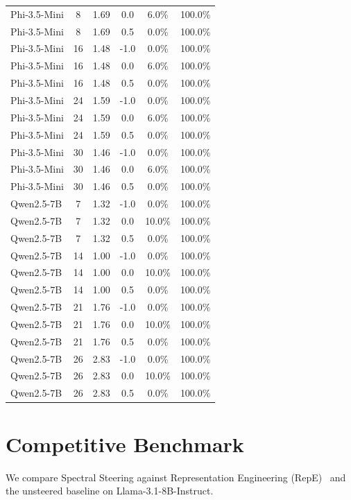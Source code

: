 \documentclass{article}
\begin{document}
\begin{center}
\begin{tabular}{lccccc}
Phi-3.5-Mini & 8 & 1.69 & 0.0 & 6.0\% & 100.0\% \\
Phi-3.5-Mini & 8 & 1.69 & 0.5 & 0.0\% & 100.0\% \\
Phi-3.5-Mini & 16 & 1.48 & -1.0 & 0.0\% & 100.0\% \\
Phi-3.5-Mini & 16 & 1.48 & 0.0 & 6.0\% & 100.0\% \\
Phi-3.5-Mini & 16 & 1.48 & 0.5 & 0.0\% & 100.0\% \\
Phi-3.5-Mini & 24 & 1.59 & -1.0 & 0.0\% & 100.0\% \\
Phi-3.5-Mini & 24 & 1.59 & 0.0 & 6.0\% & 100.0\% \\
Phi-3.5-Mini & 24 & 1.59 & 0.5 & 0.0\% & 100.0\% \\
Phi-3.5-Mini & 30 & 1.46 & -1.0 & 0.0\% & 100.0\% \\
Phi-3.5-Mini & 30 & 1.46 & 0.0 & 6.0\% & 100.0\% \\
Phi-3.5-Mini & 30 & 1.46 & 0.5 & 0.0\% & 100.0\% \\
Qwen2.5-7B & 7 & 1.32 & -1.0 & 0.0\% & 100.0\% \\
Qwen2.5-7B & 7 & 1.32 & 0.0 & 10.0\% & 100.0\% \\
Qwen2.5-7B & 7 & 1.32 & 0.5 & 0.0\% & 100.0\% \\
Qwen2.5-7B & 14 & 1.00 & -1.0 & 0.0\% & 100.0\% \\
Qwen2.5-7B & 14 & 1.00 & 0.0 & 10.0\% & 100.0\% \\
Qwen2.5-7B & 14 & 1.00 & 0.5 & 0.0\% & 100.0\% \\
Qwen2.5-7B & 21 & 1.76 & -1.0 & 0.0\% & 100.0\% \\
Qwen2.5-7B & 21 & 1.76 & 0.0 & 10.0\% & 100.0\% \\
Qwen2.5-7B & 21 & 1.76 & 0.5 & 0.0\% & 100.0\% \\
Qwen2.5-7B & 26 & 2.83 & -1.0 & 0.0\% & 100.0\% \\
Qwen2.5-7B & 26 & 2.83 & 0.0 & 10.0\% & 100.0\% \\
Qwen2.5-7B & 26 & 2.83 & 0.5 & 0.0\% & 100.0\% \\
\bottomrule
\end{tabular}
\end{center}

\section{Competitive Benchmark}
We compare Spectral Steering against Representation Engineering (RepE)~\cite{zou2023representation} and the unsteered baseline on Llama-3.1-8B-Instruct.
\end{document}

